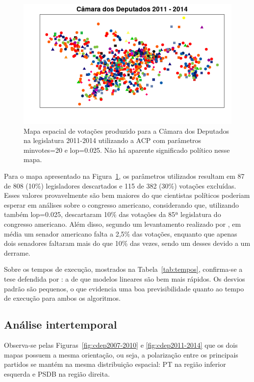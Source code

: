 \documentclass[
	article,			%
	12pt,				%
    twoside,			%
	a4paper,			%
	english,			%
	french,				%
	spanish,			%
	brazil,				%
	]{abntex2}
\begin{document}
\begin{figure}[h!]
  \centering
  \includegraphics[scale=0.7]{figs/mapa-ruim.png}
  \caption{Mapa espacial de votações produzido para a Câmara dos Deputados na legislatura 2011-2014 utilizando a ACP com parâmetros \textsf{minvotes=20} e \textsf{lop=0.025}. Não há aparente significado político nesse mapa.}
  \label{fig:mapa-ruim}
\end{figure}

Para o mapa apresentado na Figura~\ref{fig:mapa-ruim}, os parâmetros utilizados resultam em 87 de 808 (10\%) legisladores descartados e 115 de 382 (30\%) votações excluídas. Esses valores provavelmente são bem maiores do que cientistas políticos poderiam esperar em análises sobre o congresso americano, considerando que, utilizando também \textsf{lop=0.025},  descartaram 10\% das votações da 85ª legislatura do congresso americano. Além disso, segundo um levantamento realizado por , em média um senador americano falta a 2,5\% das votações, enquanto que apenas dois senadores faltaram mais do que 10\% das vezes, sendo um desses devido a um derrame. 

Sobre os tempos de execução, mostrados na Tabela~\ref{tab:tempos}, confirma-se a tese defendida por : a de que modelos lineares são bem mais rápidos. Os desvios padrão são pequenos, o que evidencia uma boa previsibilidade quanto ao tempo de execução para ambos os algoritmos.

\subsection{Análise intertemporal}

Observa-se pelas Figuras~\ref{fig:cdep2007-2010} e \ref{fig:cdep2011-2014} que os dois mapas possuem a mesma orientação, ou seja, a polarização entre os principais partidos se mantém na mesma distribuição espacial: PT na região inferior esquerda e PSDB na região direita. 
\end{document}
